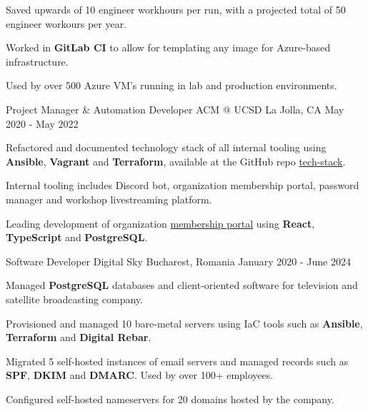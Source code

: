 \begin{cventries}
{\begin{cvitems}
        \item {Saved upwards of 10 engineer workhours per run, with a projected total of 50 engineer workours per year.}
        \item {Worked in \textbf{GitLab CI} to allow for templating any image for Azure-based infrastructure.}
        \item {Used by over 500 Azure VM's running in lab and production environments.}
      \end{cvitems}
    }
  \cventry
  {Project Manager \& Automation Developer}
  {ACM @ UCSD}
  {La Jolla, CA}
  {May 2020 - May 2022}
  {
    \begin{cvitems}
      \item {Refactored and documented technology stack of all internal tooling using \textbf{Ansible}, \textbf{Vagrant} and \textbf{Terraform}, available at the GitHub repo \href{https://github.com/acmucsd/tech-stack}{tech-stack}.}
      \item {Internal tooling includes Discord bot, organization membership portal, password manager and workshop livestreaming platform.}
      \item {Leading development of organization \href{https://github.com/acmucsd/membership-portal-ui}{membership portal} using \textbf{React}, \textbf{TypeScript} and \textbf{PostgreSQL}.}
    \end{cvitems}
  }
  \cventry
    {Software Developer}
    {Digital Sky}
    {Bucharest, Romania}
    {January 2020 - June 2024}
    {
      \begin{cvitems}
        \item {Managed \textbf{PostgreSQL} databases and client-oriented software for television and satellite broadcasting company.}
        \item {Provisioned and managed 10 bare-metal servers using IaC tools such as \textbf{Ansible}, \textbf{Terraform} and \textbf{Digital Rebar}.}
        \item {Migrated 5 self-hosted instances of email servers and managed records such as \textbf{SPF}, \textbf{DKIM} and \textbf{DMARC}. Used by over 100+ employees.}
        \item {Configured self-hosted nameservers for 20 domains hosted by the company.}
      \end{cvitems}
    }
\end{cventries}
